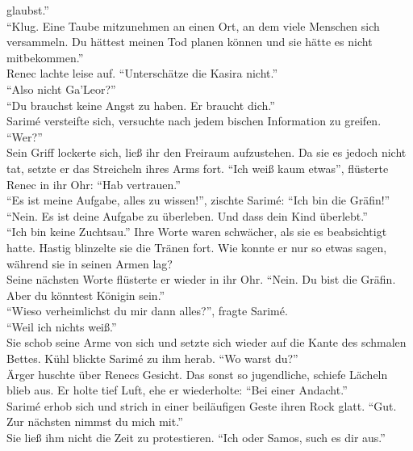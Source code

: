 glaubst.''\\
``Klug. Eine Taube mitzunehmen an einen Ort, an dem viele Menschen sich versammeln. Du hättest 
meinen Tod planen können und sie hätte es nicht mitbekommen.''\\
Renec lachte leise auf. ``Unterschätze die Kasira nicht.''\\
``Also nicht Ga'Leor?''\\
``Du brauchst keine Angst zu haben. Er braucht dich.''\\
Sarimé versteifte sich, versuchte nach jedem bischen Information zu greifen. ``Wer?''\\
Sein Griff lockerte sich, ließ ihr den Freiraum aufzustehen. Da sie es jedoch nicht tat, setzte er 
das Streicheln ihres Arms fort. ``Ich weiß kaum etwas'', flüsterte Renec in ihr Ohr: ``Hab 
vertrauen.''\\
``Es ist meine Aufgabe, alles zu wissen!'', zischte Sarimé: ``Ich bin die Gräfin!''\\
``Nein. Es ist deine Aufgabe zu überleben. Und dass dein Kind überlebt.''\\
``Ich bin keine Zuchtsau.'' Ihre Worte waren schwächer, als sie es beabsichtigt hatte. Hastig 
blinzelte sie die Tränen fort. Wie konnte er nur so etwas sagen, während sie in seinen Armen lag?\\
Seine nächsten Worte flüsterte er wieder in ihr Ohr. ``Nein. Du bist die Gräfin. Aber du könntest 
Königin sein.''\\
``Wieso verheimlichst du mir dann alles?'', fragte Sarimé.\\
``Weil ich nichts weiß.''\\
Sie schob seine Arme von sich und setzte sich wieder auf die Kante des schmalen Bettes. Kühl 
blickte Sarimé zu ihm herab. ``Wo warst du?''\\
Ärger huschte über Renecs  Gesicht. Das sonst so jugendliche, schiefe Lächeln blieb aus. Er holte 
tief Luft, ehe er wiederholte: ``Bei einer Andacht.''\\
Sarimé erhob sich und strich in einer beiläufigen Geste ihren Rock glatt. ``Gut. Zur nächsten 
nimmst du mich mit.''\\
Sie ließ ihm nicht die Zeit zu protestieren. ``Ich oder Samos, such es dir aus.''\\










